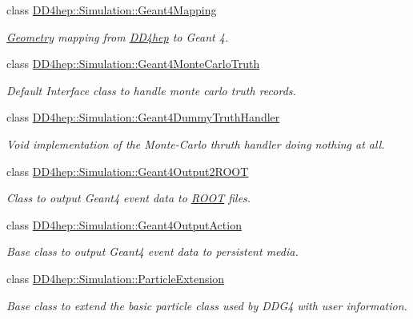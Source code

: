 \begin{DoxyCompactItemize}
class \hyperlink{class_d_d4hep_1_1_simulation_1_1_geant4_mapping}{DD4hep::Simulation::Geant4Mapping}
\begin{DoxyCompactList}\small\item\em \hyperlink{namespace_d_d4hep_1_1_geometry}{Geometry} mapping from \hyperlink{namespace_d_d4hep}{DD4hep} to Geant 4. \item\end{DoxyCompactList}\item 
class \hyperlink{class_d_d4hep_1_1_simulation_1_1_geant4_monte_carlo_truth}{DD4hep::Simulation::Geant4MonteCarloTruth}
\begin{DoxyCompactList}\small\item\em Default Interface class to handle monte carlo truth records. \item\end{DoxyCompactList}\item 
class \hyperlink{class_d_d4hep_1_1_simulation_1_1_geant4_dummy_truth_handler}{DD4hep::Simulation::Geant4DummyTruthHandler}
\begin{DoxyCompactList}\small\item\em Void implementation of the Monte-\/Carlo thruth handler doing nothing at all. \item\end{DoxyCompactList}\item 
class \hyperlink{class_d_d4hep_1_1_simulation_1_1_geant4_output2_r_o_o_t}{DD4hep::Simulation::Geant4Output2ROOT}
\begin{DoxyCompactList}\small\item\em Class to output Geant4 event data to \hyperlink{namespace_r_o_o_t}{ROOT} files. \item\end{DoxyCompactList}\item 
class \hyperlink{class_d_d4hep_1_1_simulation_1_1_geant4_output_action}{DD4hep::Simulation::Geant4OutputAction}
\begin{DoxyCompactList}\small\item\em Base class to output Geant4 event data to persistent media. \item\end{DoxyCompactList}\item 
class \hyperlink{class_d_d4hep_1_1_simulation_1_1_particle_extension}{DD4hep::Simulation::ParticleExtension}
\begin{DoxyCompactList}\small\item\em Base class to extend the basic particle class used by DDG4 with user information. \item\end{DoxyCompactList}\item 

\end{DoxyCompactItemize}
